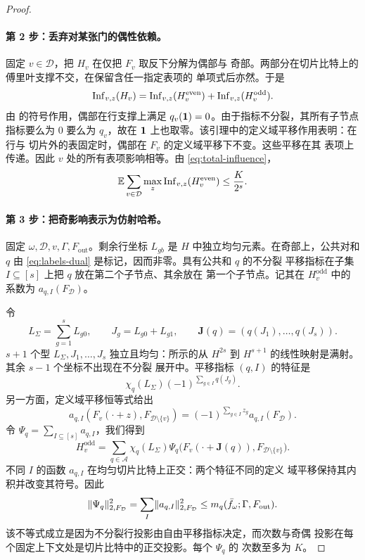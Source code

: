 \begin{proof}
\paragraph{第 2 步：丢弃对某张门的偶性依赖。}
固定 $v\in\mathcal D$，把 $H_v$ 在仅把 $F_v$ 取反下分解为偶部与
奇部。两部分在切片比特上的傅里叶支撑不交，在保留含任一指定表项的
单项式后亦然。于是
\[
 \operatorname{Inf}_{v,z}(H_v)=
 \operatorname{Inf}_{v,z}(H_v^{\mathrm{even}})
 +\operatorname{Inf}_{v,z}(H_v^{\mathrm{odd}}).
\]
由  的符号作用，偶部在行支撑上满足
$q_v(\mathbf 1)=0$。由于指标不分裂，其所有子节点指标要么为 $0$ 要么为
$q_v$，故在 $\mathbf 1$ 上也取零。该引理中的定义域平移作用表明：在行与
切片外的表固定时，偶部在 $F_v$ 的定义域平移下不变。这些平移在其
表项上传递。因此 $v$ 处的所有表项影响相等。由
\eqref{eq:total-influence}，
\begin{equation}\label{eq:even-influence}
 \mathbb E\sum_{v\in\mathcal D}
 \max_z\operatorname{Inf}_{v,z}(H_v^{\mathrm{even}})\le\frac{K}{2^s}.
\end{equation}

\paragraph{第 3 步：把奇影响表示为仿射哈希。}
固定 $\omega,\mathcal D,v,\Gamma,F_{\mathrm{out}}$。剩余行坐标
$L_{gb}$ 是 $H$ 中独立均匀元素。在奇部上，公共对和 $q$ 由
\eqref{eq:labels-dual} 是标记，因而非零。具有公共和 $q$ 的不分裂
平移指标在子集 $I\subseteq[s]$ 上把 $q$ 放在第二个子节点、其余放在
第一个子节点。记其在 $H_v^{\mathrm{odd}}$ 中的系数为
$a_{q,I}(F_{\mathcal D})$。

令
\[
 L_\Sigma=\sum_{g=1}^sL_{g0},\qquad J_g=L_{g0}+L_{g1},\qquad
 \mathbf J(q)=(q(J_1),\ldots,q(J_s)).
\]
$s+1$ 个型 $L_\Sigma,J_1,\ldots,J_s$ 独立且均匀：所示的从 $H^{2s}$
到 $H^{s+1}$ 的线性映射是满射。其余 $s-1$ 个坐标不出现在不分裂
展开中。平移指标 $(q,I)$ 的特征是
\[
 \chi_q(L_\Sigma)(-1)^{\sum_{g\in I}q(J_g)}.
\]
另一方面，定义域平移恒等式给出
\[
 a_{q,I}(F_v(\cdot+z),F_{\mathcal D\setminus\{v\}})
 =(-1)^{\sum_{g\in I}z_g}a_{q,I}(F_{\mathcal D}).
\]
令 $\Psi_q=\sum_{I\subseteq[s]}a_{q,I}$，我们得到
\begin{equation}\label{eq:odd-hash-form}
 H_v^{\mathrm{odd}}
 =\sum_{q\in\mathcal A}\chi_q(L_\Sigma)
 \Psi_q\bigl(F_v(\cdot+\mathbf J(q)),
                   F_{\mathcal D\setminus\{v\}}\bigr).
\end{equation}
不同 $I$ 的函数 $a_{q,I}$ 在均匀切片比特上正交：两个特征不同的定义
域平移保持其内积并改变其符号。因此
\begin{equation}\label{eq:psi-mass}
 \lVert\Psi_q\rVert_{2,F_{\mathcal D}}^2
 =\sum_I\lVert a_{q,I}\rVert_{2,F_{\mathcal D}}^2
 \le m_q(\bar f_\omega;\Gamma,F_{\mathrm{out}}).
\end{equation}
该不等式成立是因为不分裂行投影由自由平移指标决定，而次数与奇偶
投影在每个固定上下文处是切片比特中的正交投影。每个 $\Psi_q$ 的
次数至多为 $K$。


\end{proof}
